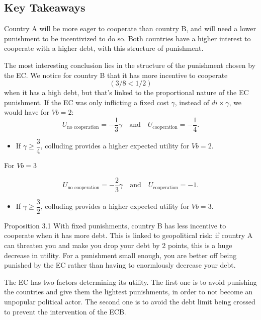 \documentclass{article}
\begin{document}
\subsection{Key Takeaways}

Country A will be more eager to cooperate than country B, and will need a lower punishment to be incentivized to do so. 
Both countries have a higher interest to cooperate with a higher debt, with this structure of punishment. 


The most interesting conclusion lies in the structure of the punishment chosen by the EC. 
We notice for country B that it has more incentive to cooperate $$(3/8 < 1/2)$$ when it has a high debt, but that's linked to the proportional nature of the EC punishment. 
If the EC was only inflicting a fixed cost $\gamma$, instead of $di \times \gamma$, we would have for $Vb=2$: 
\[
U_{\text{no cooperation}} = -\frac{1}{3} \gamma
\quad \text{and} \quad
U_{\text{cooperation}} = -\frac{1}{4}.
\]

\begin{itemize}
    \item If $\gamma \geq \dfrac{3}{4}$, colluding provides a higher expected utility for $Vb=2$.
\end{itemize}

For  $Vb=3$

\[
U_{\text{no cooperation}} = -\frac{2}{3} \gamma
\quad \text{and} \quad
U_{\text{cooperation}} = -1.
\]

\begin{itemize}
    \item If $\gamma \geq \dfrac{3}{2}$, colluding provides a higher expected utility for $Vb=3$.
\end{itemize}
\begin{simplebox}{Proposition 3.1}
   With fixed punishments, country B has less incentive to cooperate when it has more debt. This is linked to geopolitical risk: if country A can threaten you and make you drop your debt by 2 points, this is a huge decrease in utility. For a punishment small enough, you are better off being punished by the EC rather than having to enormlously decrease your debt.
\end{simplebox}


The EC has two factors determining its utility.  The first one is to avoid punishing the countries and give them the lightest punishments, in order to not become an unpopular political actor. The second one is to avoid the debt limit being crossed to prevent the intervention of the ECB. \\
\end{document}
